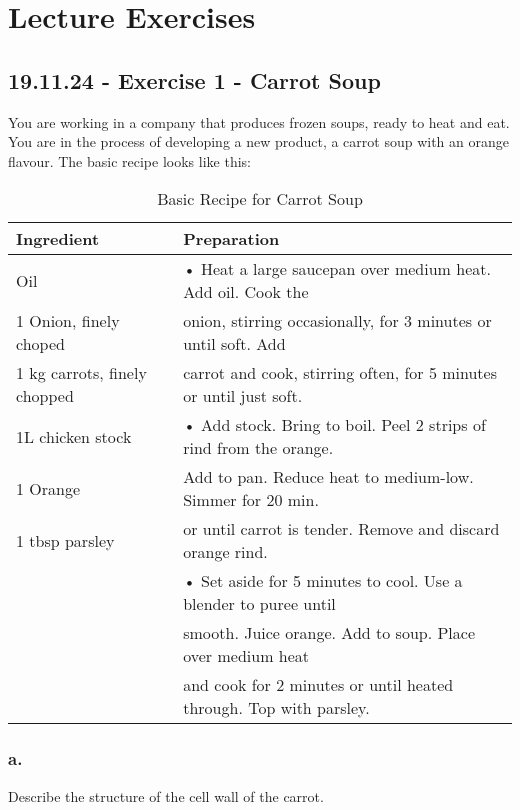 \chapter{Lecture Exercises}
\setlength{\headheight}{22.94003pt}
\addtolength{\topmargin}{-10.22661pt}

\section{19.11.24 - Exercise 1 - Carrot Soup}
You are working in a company that produces frozen soups, ready to heat and eat. You are in the process of developing a new product, a carrot soup with an orange flavour. The basic recipe looks like this:

\begin{table}
    \centering
    \caption{Basic Recipe for Carrot Soup}
    \label{tab:carrot_soup}
    \begin{tabular}{l|p{10cm}}
    \textbf{Ingredient} & \textbf{Preparation} \\
    \hline
    Oil & • Heat a large saucepan over medium heat. Add oil. Cook the  \\
    \cline{1-1}
    1 Onion, finely choped & onion, stirring occasionally, for 3 minutes or until soft. Add \\
    \cline{1-1}
    1 kg carrots, finely chopped & carrot and cook, stirring often, for 5 minutes or until just soft. \\
    \cline{1-1}
    1L chicken stock & • Add stock. Bring to boil. Peel 2 strips of rind from the orange.  \\
    \cline{1-1}
    1 Orange & Add to pan. Reduce heat to medium-low. Simmer for 20 min. \\
    \cline{1-1}
    1 tbsp parsley & or until carrot is tender. Remove and discard orange rind. \\
    & • Set aside for 5 minutes to cool. Use a blender to puree until \\
    & smooth. Juice orange. Add to soup. Place over medium heat \\
    & and cook for 2 minutes or until heated through. Top with parsley. \\

    \end{tabular}
\end{table}

\subsection*{a.}
Describe the structure of the cell wall of the carrot.

